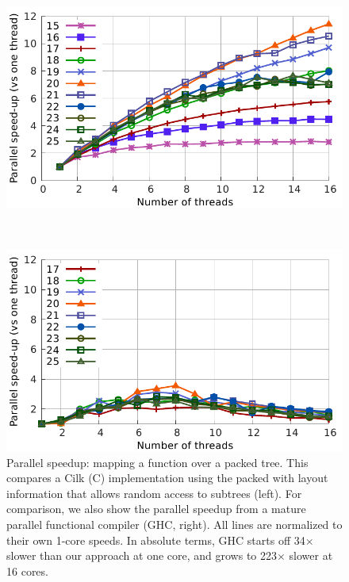 \documentclass[a4paper,english]{lipics-v2016}
\begin{document}
\begin{figure}[t]
    \centering
  \begin{minipage}{.75\textwidth}
    \centering
    \includegraphics[width=\textwidth]{./figs/speedup_handwritten-c-packed-cilk_cutter_pardepth8.pdf}    
  \end{minipage}
  $ $ 
  \begin{minipage}{.75\textwidth} 
    \centering
    \includegraphics[width=\textwidth]{./figs/speedup_ghc.pdf}
  \end{minipage}
   \caption{Parallel speedup: mapping a function over a packed tree.  This
     compares a Cilk (C) implementation using the packed with layout information
     that allows random access to subtrees (left).  For comparison, we also show
     the parallel speedup from a mature parallel functional compiler (GHC,
     right).  All lines are normalized to their own 1-core speeds.  In absolute
     terms, GHC starts off 34$\times$ slower than our approach at one core, and
     grows to 223$\times$ slower at 16 cores.}
   \label{fig:par-shootout}
\end{figure}
\end{document}
